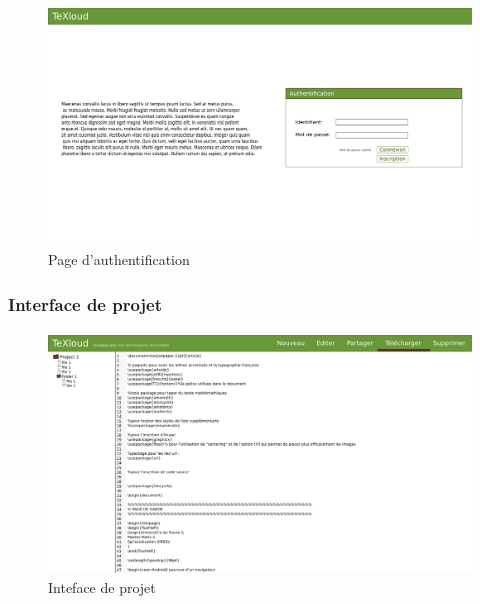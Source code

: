 \documentclass[a4paper,12pt]{article}
\begin{document}
\paragraph{}
\begin{figure}[!ht]
\begin{center}
  \includegraphics[width=1\textwidth, angle=90]{../layout/layout_texloud_login.png}
\end{center}
  \caption{Page d'authentification}
  \label{uiAuth}
\end{figure}

\newpage
\subsubsection{Interface de projet}
\paragraph{}
\begin{figure}[!ht]
\begin{center}
  \includegraphics[width=1\textwidth, angle=90]{../layout/layout_texloud_project.png}
\end{center}
  \caption{Inteface de projet}
  \label{uiProject}
\end{figure}
\end{document}
